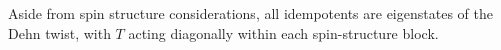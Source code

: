Aside from spin structure considerations, all idempotents are eigenstates of the Dehn twist,
with $T$ acting diagonally within each spin-structure block. 

\begin{comment}
\ethan{This is redundant since we have a summary matrix, which is more readable, directly after this}
\begin{align}
\left( \begin{matrix}
\widehat{\text{Q}}_1\\
\widehat{\text{Q}}_2\\
\text{M}_6\\
\end{matrix} \right)_{NB} \xrightarrow{T^{NB \rightarrow NB}}
\left( \begin{matrix}
1 & 0 & 0\\
0 & -i & 0 \\
0 & 0& e^{5i \pi /6} \\
\end{matrix} \right)
\left( \begin{matrix}
\widehat{\text{Q}}_1\\
\widehat{\text{Q}}_2\\
\text{M}_6\\
\end{matrix} \right)_{NB}
\end{align}

\begin{align}
\left( \begin{matrix}
\text{M}_1\\
\text{M}_2\\
\text{M}_3\\
\end{matrix} \right)_{BB} 
\xrightarrow{T_{BB \rightarrow BN}} 
\left(\begin{matrix} 
1 & 0 &0 \\
0 & 1 & 0 \\
0 & 0 & e^{i \pi /3} \\
\end{matrix} \right)
\left( \begin{matrix}
\text{M}_1\\
\text{M}_2\\
\text{M}_3\\
\end{matrix} \right)_{BN}
\end{align}


\end{comment}
